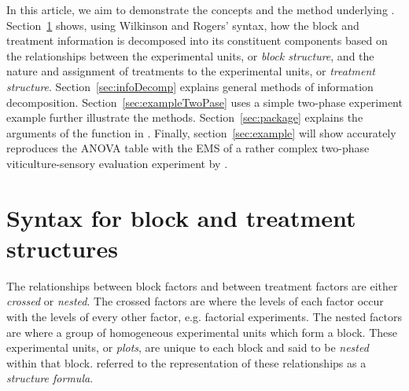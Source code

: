 \documentclass[article]{jss}
\begin{document}
In this article, we aim to demonstrate the concepts and the method underlying . Section~\ref{sec:tierStru} shows, using Wilkinson and Rogers' syntax, how the block and treatment information is decomposed into its constituent components based on the relationships between the experimental units, or \emph{block structure}, and the nature and assignment of treatments to the experimental units, or \emph{treatment structure}. Section~\ref{sec:infoDecomp} explains general methods of information decomposition. Section~\ref{sec:exampleTwoPase} uses a simple two-phase experiment example further illustrate the methods. Section~\ref{sec:package} explains the arguments of the  function in . Finally,  section~\ref{sec:example} will show  accurately reproduces the ANOVA table with the EMS of a rather complex two-phase viticulture-sensory evaluation experiment by \cite{Brien1999}.


\section{Syntax for block and treatment structures}\label{sec:tierStru}
The relationships between block factors and between treatment factors are either \emph{crossed} or \emph{nested}. The crossed factors are where the levels of each factor occur with the levels of every other factor, e.g. factorial experiments. The nested factors are where a group of homogeneous experimental units which form a block. These experimental units, or \emph{plots}, are unique to each block and said to be \emph{nested} within that block. \cite{Brien1999} referred to the representation of these relationships as a \emph{structure formula}. 
\end{document}
